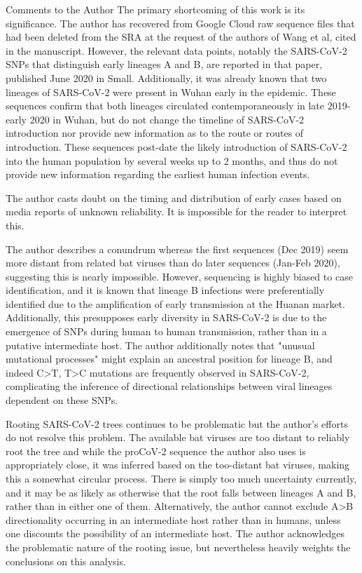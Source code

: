 \documentclass[11pt, oneside]{article}   	%
\begin{document}
Comments to the Author
The primary shortcoming of this work is its significance. The author has recovered from Google Cloud raw sequence files that had been deleted from the SRA at the request of the authors of Wang et al, cited in the manuscript. However, the relevant data points, notably the SARS-CoV-2 SNPs that distinguish early lineages A and B, are reported in that paper, published June 2020 in Small. Additionally, it was already known that two lineages of SARS-CoV-2 were present in Wuhan early in the epidemic. These sequences confirm that both lineages circulated contemporaneously in late 2019-early 2020 in Wuhan, but do not change the timeline of SARS-CoV-2 introduction nor provide new information as to the route or routes of introduction. These sequences post-date the likely introduction of SARS-CoV-2 into the human population by several weeks up to 2 months, and thus do not provide new information regarding the earliest human infection events.

The author casts doubt on the timing and distribution of early cases based on media reports of unknown reliability. It is impossible for the reader to interpret this.

The author describes a conundrum whereas the first sequences (Dec 2019) seem more distant from related bat viruses than do later sequences (Jan-Feb 2020), suggesting this is nearly impossible. However, sequencing is highly biased to case identification, and it is known that lineage B infections were preferentially identified due to the amplification of early transmission at the Huanan market. Additionally, this presupposes early diversity in SARS-CoV-2 is due to the emergence of SNPs during human to human transmission, rather than in a putative intermediate host. The author additionally notes that "unusual mutational processes" might explain an ancestral position for lineage B, and indeed C>T, T>C mutations are frequently observed in SARS-CoV-2, complicating the inference of directional relationships between viral lineages dependent on these SNPs.

Rooting SARS-CoV-2 trees continues to be problematic but the author's efforts do not resolve this problem. The available bat viruses are too distant to reliably root the tree and while the proCoV-2 sequence the author also uses is appropriately close, it was inferred based on the too-distant bat viruses, making this a somewhat circular process. There is simply too much uncertainty currently, and it may be as likely as otherwise that the root falls between lineages A and B, rather than in either one of them. Alternatively, the author cannot exclude A>B directionality occurring in an intermediate host rather than in humans, unless one discounts the possibility of an intermediate host. The author acknowledges the problematic nature of the rooting issue, but nevertheless heavily weights the conclusions on this analysis.
\end{document}
